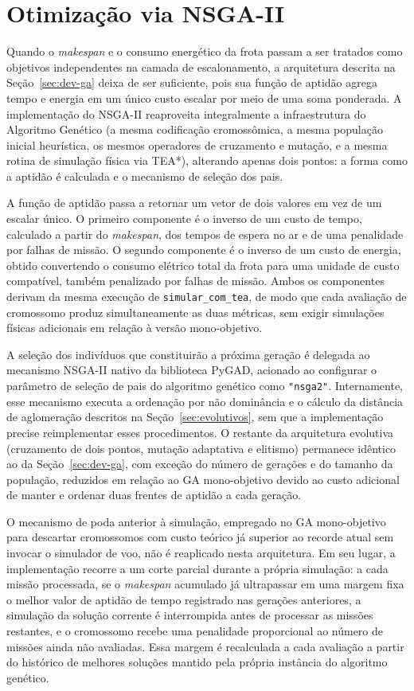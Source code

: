 \section{Otimização via NSGA-II}\label{sec:dev-nsga}

Quando o \textit{makespan} e o consumo energético da frota passam a ser tratados como objetivos independentes na camada de escalonamento, a arquitetura descrita na Seção~\ref{sec:dev-ga} deixa de ser suficiente, pois sua função de aptidão agrega tempo e energia em um único custo escalar por meio de uma soma ponderada. A implementação do NSGA-II reaproveita integralmente a infraestrutura do Algoritmo Genético (a mesma codificação cromossômica, a mesma população inicial heurística, os mesmos operadores de cruzamento e mutação, e a mesma rotina de simulação física via TEA*), alterando apenas dois pontos: a forma como a aptidão é calculada e o mecanismo de seleção dos pais.

A função de aptidão passa a retornar um vetor de dois valores em vez de um escalar único. O primeiro componente é o inverso de um custo de tempo, calculado a partir do \textit{makespan}, dos tempos de espera no ar e de uma penalidade por falhas de missão. O segundo componente é o inverso de um custo de energia, obtido convertendo o consumo elétrico total da frota para uma unidade de custo compatível, também penalizado por falhas de missão. Ambos os componentes derivam da mesma execução de \texttt{simular\_com\_tea}, de modo que cada avaliação de cromossomo produz simultaneamente as duas métricas, sem exigir simulações físicas adicionais em relação à versão mono-objetivo.

A seleção dos indivíduos que constituirão a próxima geração é delegada ao mecanismo NSGA-II nativo da biblioteca PyGAD, acionado ao configurar o parâmetro de seleção de pais do algoritmo genético como \texttt{"nsga2"}. Internamente, esse mecanismo executa a ordenação por não dominância e o cálculo da distância de aglomeração descritos na Seção~\ref{sec:evolutivos}, sem que a implementação precise reimplementar esses procedimentos. O restante da arquitetura evolutiva (cruzamento de dois pontos, mutação adaptativa e elitismo) permanece idêntico ao da Seção~\ref{sec:dev-ga}, com exceção do número de gerações e do tamanho da população, reduzidos em relação ao GA mono-objetivo devido ao custo adicional de manter e ordenar duas frentes de aptidão a cada geração.

O mecanismo de poda anterior à simulação, empregado no GA mono-objetivo para descartar cromossomos com custo teórico já superior ao recorde atual sem invocar o simulador de voo, não é reaplicado nesta arquitetura. Em seu lugar, a implementação recorre a um corte parcial durante a própria simulação: a cada missão processada, se o \textit{makespan} acumulado já ultrapassar em uma margem fixa o melhor valor de aptidão de tempo registrado nas gerações anteriores, a simulação da solução corrente é interrompida antes de processar as missões restantes, e o cromossomo recebe uma penalidade proporcional ao número de missões ainda não avaliadas. Essa margem é recalculada a cada avaliação a partir do histórico de melhores soluções mantido pela própria instância do algoritmo genético.


